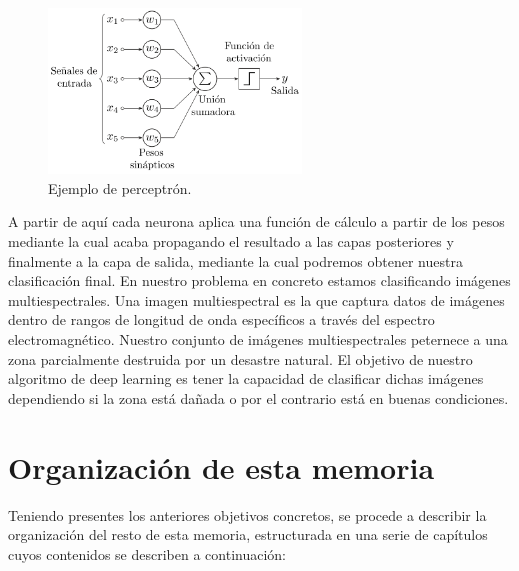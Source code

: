 \begin{figure}
  \centering
    \includegraphics[width=0.6\textwidth]{images/chapter1/perceptron.png}
  \caption{Ejemplo de perceptrón.}
  \label{fig:Perceptrón}
\end{figure}
A partir de aquí cada neurona aplica una función de cálculo a partir de los pesos mediante la cual acaba propagando el resultado a las capas posteriores y finalmente
a la capa de salida, mediante la cual podremos obtener nuestra clasificación final.
En nuestro problema en concreto estamos clasificando imágenes multiespectrales.
Una imagen multiespectral es la que captura datos de imágenes dentro de rangos de longitud de onda específicos a través del espectro electromagnético.
Nuestro conjunto de imágenes multiespectrales peternece a una zona parcialmente destruida por un desastre natural.
El objetivo de nuestro algoritmo de deep learning es tener la capacidad de clasificar dichas imágenes dependiendo si la zona está dañada o por el contrario está en buenas condiciones.

\section{Organización de esta memoria}\label{sec:organización-de-esta-memoria}

Teniendo presentes los anteriores objetivos concretos, se procede a describir la organización del resto de esta memoria, estructurada en una serie de capítulos cuyos contenidos se
describen a continuación:

